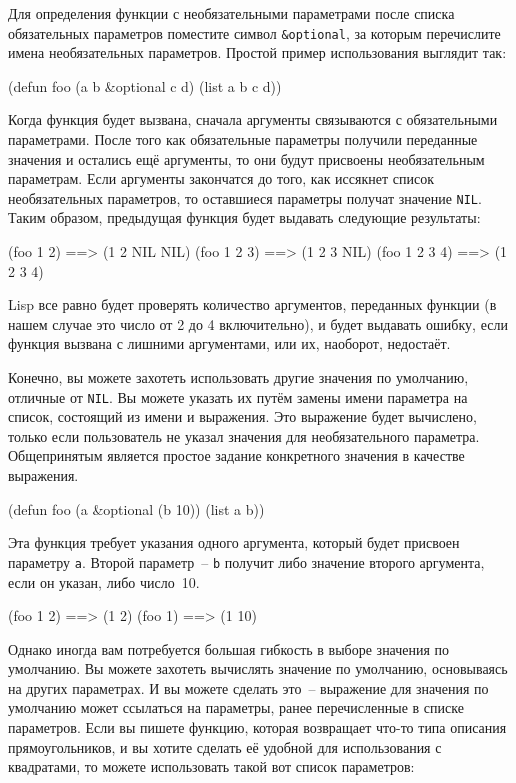 Для определения функции с необязательными параметрами после списка обязательных параметров
поместите символ \lstinline!&optional!, за которым перечислите имена необязательных
параметров.  Простой пример использования выглядит так:

\begin{myverb}
(defun foo (a b &optional c d) 
  (list a b c d))
\end{myverb}

Когда функция будет вызвана, сначала аргументы связываются с обязательными параметрами.
После того как обязательные параметры получили переданные значения и остались ещё
аргументы, то они будут присвоены необязательным параметрам.  Если аргументы закончатся до
того, как иссякнет список необязательных параметров, то оставшиеся параметры получат
значение \lstinline{NIL}.  Таким образом, предыдущая функция будет выдавать следующие
результаты:

\begin{myverb}
(foo 1 2)     ==> (1 2 NIL NIL)
(foo 1 2 3)   ==> (1 2 3 NIL)
(foo 1 2 3 4) ==> (1 2 3 4)
\end{myverb}

Lisp все равно будет проверять количество аргументов, переданных функции (в нашем случае
это число от 2 до 4 включительно), и будет выдавать ошибку, если функция вызвана с
лишними аргументами, или их, наоборот, недостаёт.

Конечно, вы можете захотеть использовать другие значения по умолчанию, отличные от
\lstinline{NIL}.  Вы можете указать их путём замены имени параметра на список, состоящий из
имени и выражения.  Это выражение будет вычислено, только если пользователь не указал
значения для необязательного параметра.  Общепринятым является простое задание конкретного
значения в качестве выражения.

\begin{myverb}
(defun foo (a &optional (b 10)) 
  (list a b))
\end{myverb}

Эта функция требует указания одного аргумента, который будет присвоен параметру \lstinline{a}.
Второй параметр~-- \lstinline{b} получит либо значение второго аргумента, если он указан, либо
число~10.

\begin{myverb}
(foo 1 2) ==> (1 2)
(foo 1)   ==> (1 10)
\end{myverb}

Однако иногда вам потребуется большая гибкость в выборе значения по умолчанию.  Вы
можете захотеть вычислять значение по умолчанию, основываясь на других параметрах.  И вы
можете сделать это~-- выражение для значения по умолчанию может ссылаться на параметры,
ранее перечисленные в списке параметров.  Если вы пишете функцию, которая возвращает
что-то типа описания прямоугольников, и вы хотите сделать её удобной для использования с
квадратами, то можете использовать такой вот список параметров:

